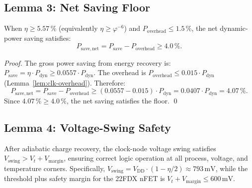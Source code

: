 \subsection{Lemma 3: Net Saving Floor}
\label{lemma:netsave-w46}

\begin{lemma}\label{lem:net-save}
When $\eta \geq 5.57\,\%$ (equivalently $\eta \geq \varphi^{-6}$) and
$P_{\mathrm{overhead}} \leq 1.5\,\%$, the net dynamic-power saving satisfies:
\begin{equation}
  P_{\mathrm{save,net}} = P_{\mathrm{save}} - P_{\mathrm{overhead}} \geq 4.0\,\%.
\end{equation}
\end{lemma}

\begin{proof}
The gross power saving from energy recovery is:
$P_{\mathrm{save}} = \eta \cdot P_{\mathrm{dyn}} \geq 0.0557 \cdot P_{\mathrm{dyn}}$.
The overhead is $P_{\mathrm{overhead}} \leq 0.015 \cdot P_{\mathrm{dyn}}$
(Lemma~\ref{lem:clk-overhead}).
Therefore:
\begin{equation}
  P_{\mathrm{save,net}} = P_{\mathrm{save}} - P_{\mathrm{overhead}}
  \geq (0.0557 - 0.015) \cdot P_{\mathrm{dyn}}
  = 0.0407 \cdot P_{\mathrm{dyn}}
  = 4.07\,\%.
\end{equation}
Since $4.07\,\% \geq 4.0\,\%$, the net saving satisfies the floor.
\qed
\end{proof}

\subsection{Lemma 4: Voltage-Swing Safety}
\label{lemma:vswing-w46}

\begin{lemma}\label{lem:vswing}
After adiabatic charge recovery, the clock-node voltage swing satisfies
$V_{\mathrm{swing}} > V_{t} + V_{\mathrm{margin}}$, ensuring correct logic
operation at all process, voltage, and temperature corners.
Specifically, $V_{\mathrm{swing}} = V_{\mathrm{DD}} \cdot (1 - \eta/2) \approx 793\,\text{mV}$,
while the threshold plus safety margin for the 22FDX nFET is
$V_{t} + V_{\mathrm{margin}} \leq 600\,\text{mV}$.
\end{lemma}

